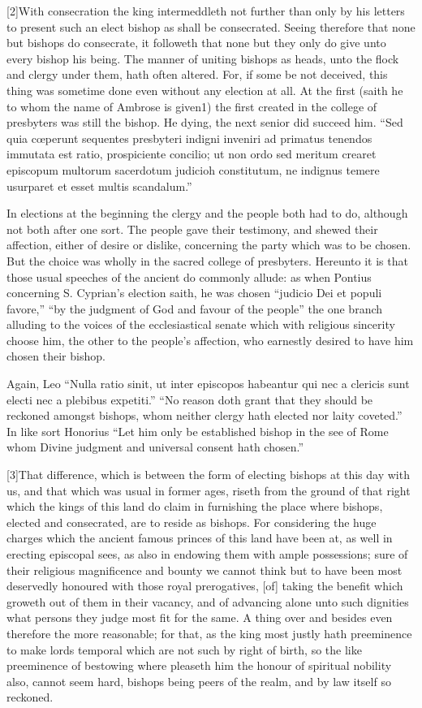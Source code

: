 [2]With consecration the king intermeddleth not further than only by his letters to present such an elect bishop as shall be consecrated. Seeing therefore that none but bishops do consecrate, it followeth that none but they only do give unto every bishop his being. The manner of uniting bishops as heads, unto the flock and clergy under them, hath often  altered. For, if some be not deceived, this thing was sometime done even without any election at all. At the first (saith he to whom the name of Ambrose is given1) the first created in the college of presbyters was still the bishop. He dying, the next senior did succeed him. “Sed quia cœperunt sequentes presbyteri indigni inveniri ad primatus tenendos immutata est ratio, prospiciente concilio; ut non ordo sed meritum crearet episcopum multorum sacerdotum judicioh constitutum, ne indignus temere usurparet et esset multis scandalum.”

In elections at the beginning the clergy and the people both had to do, although not both after one sort. The people gave their testimony, and shewed their affection, either of desire or dislike, concerning the party which was to be chosen. But the choice was wholly in the sacred college of presbyters. Hereunto it is that those usual speeches of the ancient do commonly allude: as when Pontius concerning S. Cyprian’s election saith, he was chosen “judicio Dei et populi favore,” “by the judgment of God and favour of the people” the one branch alluding to the voices of the ecclesiastical senate which with religious sincerity choose him, the other to the people’s affection, who earnestly desired to have him chosen their bishop.

Again, Leo “Nulla ratio sinit, ut inter episcopos habeantur qui nec a clericis sunt electi nec a plebibus expetiti.” “No reason doth grant that they should be reckoned amongst bishops, whom neither clergy hath elected nor laity coveted.” In like sort Honorius “Let him only be established bishop  in the see of Rome whom Divine judgment and universal consent hath chosen.”

[3]That difference, which is between the form of electing bishops at this day with us, and that which was usual in former ages, riseth from the ground of that right which the kings of this land do claim in furnishing the place where bishops, elected and consecrated, are to reside as bishops. For considering the huge charges which the ancient famous princes of this land have been at, as well in erecting episcopal sees, as also in endowing them with ample possessions; sure of their religious magnificence and bounty we cannot think but to have been most deservedly honoured with those royal prerogatives, [of] taking the benefit which groweth out of them in their vacancy, and of advancing alone unto such dignities what persons they judge most fit for the same. A thing over and besides even therefore the more reasonable; for that, as the king most justly hath preeminence to make lords temporal which are not such by right of birth, so the like preeminence of bestowing where pleaseth him the honour of spiritual nobility also, cannot seem hard, bishops being peers of the realm, and by law itself so reckoned.

